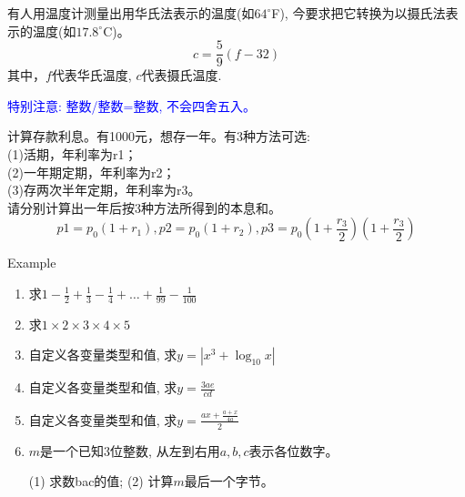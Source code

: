 \begin{frame}[shrink]
\begin{example}[例3.1 p37]
	有人用温度计测量出用华氏法表示的温度(如$64^\circ$F), 
	今要求把它转换为以摄氏法表示的温度(如$17.8^\circ$C)。
	\[ c=\frac{5}{9}(f-32) \]
	其中，$f$代表华氏温度, $c$代表摄氏温度. 
	
	\textcolor{blue}{特别注意: 整数/整数=整数, 不会四舍五入。}
\end{example}
\begin{example}[例3.2 p38]
	计算存款利息。有1000元，想存一年。有3种方法可选:\\
	(1)活期，年利率为r1；\\
	(2)一年期定期，年利率为r2；\\
	(3)存两次半年定期，年利率为r3。\\
	请分别计算出一年后按3种方法所得到的本息和。\\
	\[p1=p_0(1+r_1),p2=p_0(1+r_2),p3=p_0(1+\frac{r_3}{2})(1+\frac{r_3}{2}) \]
\end{example}
\end{frame}

\begin{frame}[shrink]{Example}
\begin{enumerate}
	\item 求$1-\frac{1}{2}+\frac{1}{3}-\frac{1}{4}+\dots+\frac{1}{99}-\frac{1}{100}$\\
	\item 求$1\times 2\times 3\times 4\times 5$\\
	\item 自定义各变量类型和值, 求$y=|x^3+\log_{10} x|$\\
	\item 自定义各变量类型和值, 求$y=\frac{3ae}{cd}$\\
	\item 自定义各变量类型和值, 求$y=\frac{ax+\frac{a+x}{4a}}{2}$\\
	\item $m$是一个已知3位整数, 从左到右用$a,b,c$表示各位数字。
	
	(1) 求数bac的值; \quad (2) 计算$m$最后一个字节。
\end{enumerate}
\end{frame}


